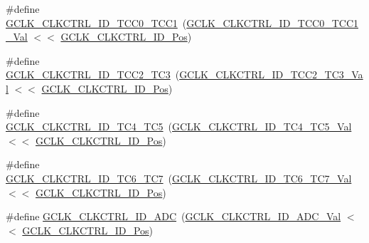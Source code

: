 \begin{DoxyCompactItemize}
\item 
\#define \mbox{\hyperlink{group___s_a_m_d21___g_c_l_k_ga8e0a203b672c5344e8e9cad84d5a6f9e}{G\+C\+L\+K\+\_\+\+C\+L\+K\+C\+T\+R\+L\+\_\+\+I\+D\+\_\+\+T\+C\+C0\+\_\+\+T\+C\+C1}}~(\mbox{\hyperlink{group___s_a_m_d21___g_c_l_k_ga186870cd8d31d127b17008e778ab1599}{G\+C\+L\+K\+\_\+\+C\+L\+K\+C\+T\+R\+L\+\_\+\+I\+D\+\_\+\+T\+C\+C0\+\_\+\+T\+C\+C1\+\_\+\+Val}} $<$$<$ \mbox{\hyperlink{group___s_a_m_d21___g_c_l_k_ga882860b306b819b8bb342bebd55c23aa}{G\+C\+L\+K\+\_\+\+C\+L\+K\+C\+T\+R\+L\+\_\+\+I\+D\+\_\+\+Pos}})
\item 
\#define \mbox{\hyperlink{group___s_a_m_d21___g_c_l_k_gac1cb609eb4263251367be6d5ce60e528}{G\+C\+L\+K\+\_\+\+C\+L\+K\+C\+T\+R\+L\+\_\+\+I\+D\+\_\+\+T\+C\+C2\+\_\+\+T\+C3}}~(\mbox{\hyperlink{group___s_a_m_d21___g_c_l_k_ga855fa017d163420dc1a347eb24876d65}{G\+C\+L\+K\+\_\+\+C\+L\+K\+C\+T\+R\+L\+\_\+\+I\+D\+\_\+\+T\+C\+C2\+\_\+\+T\+C3\+\_\+\+Val}}  $<$$<$ \mbox{\hyperlink{group___s_a_m_d21___g_c_l_k_ga882860b306b819b8bb342bebd55c23aa}{G\+C\+L\+K\+\_\+\+C\+L\+K\+C\+T\+R\+L\+\_\+\+I\+D\+\_\+\+Pos}})
\item 
\#define \mbox{\hyperlink{group___s_a_m_d21___g_c_l_k_ga5316e2928a72fe2b59814f09a6b3f498}{G\+C\+L\+K\+\_\+\+C\+L\+K\+C\+T\+R\+L\+\_\+\+I\+D\+\_\+\+T\+C4\+\_\+\+T\+C5}}~(\mbox{\hyperlink{group___s_a_m_d21___g_c_l_k_ga6e2e800404f3b2e6948ced5f489aa557}{G\+C\+L\+K\+\_\+\+C\+L\+K\+C\+T\+R\+L\+\_\+\+I\+D\+\_\+\+T\+C4\+\_\+\+T\+C5\+\_\+\+Val}}   $<$$<$ \mbox{\hyperlink{group___s_a_m_d21___g_c_l_k_ga882860b306b819b8bb342bebd55c23aa}{G\+C\+L\+K\+\_\+\+C\+L\+K\+C\+T\+R\+L\+\_\+\+I\+D\+\_\+\+Pos}})
\item 
\#define \mbox{\hyperlink{group___s_a_m_d21___g_c_l_k_ga34f73ae7c50fbe4bbffc3e3a8836786a}{G\+C\+L\+K\+\_\+\+C\+L\+K\+C\+T\+R\+L\+\_\+\+I\+D\+\_\+\+T\+C6\+\_\+\+T\+C7}}~(\mbox{\hyperlink{group___s_a_m_d21___g_c_l_k_ga540d3e213ae8c696000670dbc1ea3721}{G\+C\+L\+K\+\_\+\+C\+L\+K\+C\+T\+R\+L\+\_\+\+I\+D\+\_\+\+T\+C6\+\_\+\+T\+C7\+\_\+\+Val}}   $<$$<$ \mbox{\hyperlink{group___s_a_m_d21___g_c_l_k_ga882860b306b819b8bb342bebd55c23aa}{G\+C\+L\+K\+\_\+\+C\+L\+K\+C\+T\+R\+L\+\_\+\+I\+D\+\_\+\+Pos}})
\item 
\#define \mbox{\hyperlink{group___s_a_m_d21___g_c_l_k_gad652342e4d51127ddc598eccd3cb0af6}{G\+C\+L\+K\+\_\+\+C\+L\+K\+C\+T\+R\+L\+\_\+\+I\+D\+\_\+\+A\+DC}}~(\mbox{\hyperlink{group___s_a_m_d21___g_c_l_k_gafa044a1103ba6b6a8bc6d7f7d44c4cea}{G\+C\+L\+K\+\_\+\+C\+L\+K\+C\+T\+R\+L\+\_\+\+I\+D\+\_\+\+A\+D\+C\+\_\+\+Val}}       $<$$<$ \mbox{\hyperlink{group___s_a_m_d21___g_c_l_k_ga882860b306b819b8bb342bebd55c23aa}{G\+C\+L\+K\+\_\+\+C\+L\+K\+C\+T\+R\+L\+\_\+\+I\+D\+\_\+\+Pos}})
$$
\end{DoxyCompactItemize}
